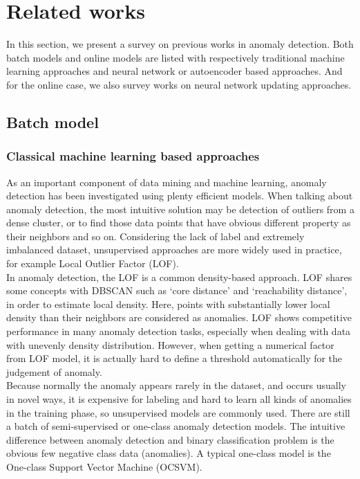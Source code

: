\chapter{Related works}
\label{chap:relatedworks}

In this section, we present a survey on previous works in anomaly detection. Both batch models and online models are listed with respectively traditional machine learning approaches and neural network or autoencoder based approaches. And for the online case, we also survey works on neural network updating approaches.

\section{Batch model}
\label{sec:batch}

\subsection{Classical machine learning based approaches}
\label{sec:classical}

As an important component of data mining and machine learning, anomaly detection has been investigated using plenty efficient models. When talking about anomaly detection, the most intuitive solution may be detection of outliers from a dense cluster, or to find those data points that have obvious different property as their neighbors and so on. Considering the lack of label and extremely imbalanced dataset, unsupervised approaches are more widely used in practice,
for example Local Outlier Factor (LOF).\\

In anomaly detection, the LOF is a common density-based approach. LOF shares some concepts with DBSCAN such as ‘core distance’ and ‘reachability distance’, in order to estimate local density. Here, points with substantially lower local density than their neighbors are considered as anomalies. LOF shows competitive performance in many anomaly detection tasks, especially when dealing with data with unevenly density distribution. However, when getting a numerical factor from LOF model, it is actually hard to define a threshold automatically for the judgement of anomaly.\\

Because normally the anomaly appears rarely in the dataset, and occurs usually in novel ways, it is expensive for labeling and hard to learn all kinds of anomalies in the training phase, so unsupervised models are commonly used. There are still a batch of semi-supervised or one-class anomaly detection models. The intuitive difference between anomaly detection and binary classification problem is the obvious few negative class data (anomalies). A typical one-class model is the One-class Support Vector Machine (OCSVM).\\

